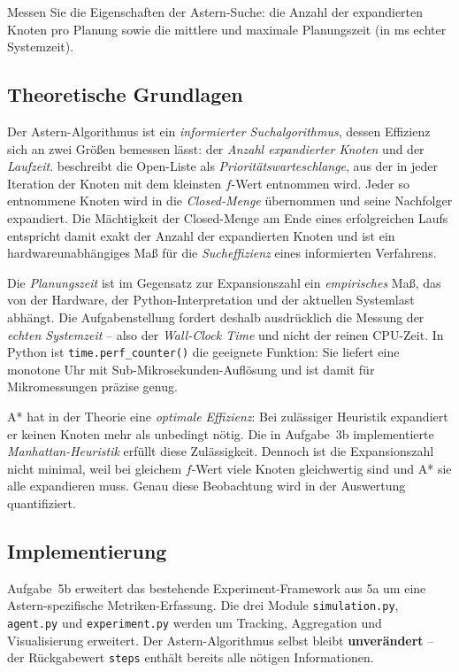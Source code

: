 Messen Sie die Eigenschaften der \acs{Astern}-Suche: die Anzahl der expandierten Knoten pro Planung sowie die mittlere und maximale Planungszeit (in ms echter Systemzeit).

\subsection{Theoretische Grundlagen}

Der \acs{Astern}-Algorithmus ist ein \textit{informierter Suchalgorithmus}, dessen Effizienz sich an zwei Größen bemessen lässt: der \textit{Anzahl expandierter Knoten} und der \textit{Laufzeit}. \textcite[S. 21\,f.]{5} beschreibt die Open-Liste als \textit{Prioritätswarteschlange}, aus der in jeder Iteration der Knoten mit dem kleinsten \(f\)-Wert entnommen wird. Jeder so entnommene Knoten wird in die \textit{Closed-Menge} übernommen und seine Nachfolger expandiert. Die Mächtigkeit der Closed-Menge am Ende eines erfolgreichen Laufs entspricht damit exakt der Anzahl der expandierten Knoten und ist ein hardwareunabhängiges Maß für die \textit{Sucheffizienz} eines informierten Verfahrens.

Die \textit{Planungszeit} ist im Gegensatz zur Expansionszahl ein \textit{empirisches} Maß, das von der Hardware, der Python-Interpretation und der aktuellen Systemlast abhängt. Die Aufgabenstellung fordert deshalb ausdrücklich die Messung der \textit{echten Systemzeit} -- also der \textit{Wall-Clock Time} und nicht der reinen CPU-Zeit. In Python ist \texttt{time.perf\_counter()} die geeignete Funktion: Sie liefert eine monotone Uhr mit Sub-Mikrosekunden-Auflösung und ist damit für Mikromessungen präzise genug.

A* hat in der Theorie eine \textit{optimale Effizienz}: Bei zulässiger Heuristik expandiert er keinen Knoten mehr als unbedingt nötig. Die in Aufgabe~3b implementierte \textit{Manhattan-Heuristik} erfüllt diese Zulässigkeit. Dennoch ist die Expansionszahl nicht minimal, weil bei gleichem \(f\)-Wert viele Knoten gleichwertig sind und A* sie alle expandieren muss. Genau diese Beobachtung wird in der Auswertung quantifiziert.

\subsection{Implementierung}

Aufgabe~5b erweitert das bestehende Experiment-Framework aus 5a um eine \acs{Astern}-spezifische Metriken-Erfassung. Die drei Module \texttt{simulation.py}, \texttt{agent.py} und \texttt{experiment.py} werden um Tracking, Aggregation und Visualisierung erweitert. Der \acs{Astern}-Algorithmus selbst bleibt \textbf{unverändert} -- der Rückgabewert \texttt{steps} enthält bereits alle nötigen Informationen.

